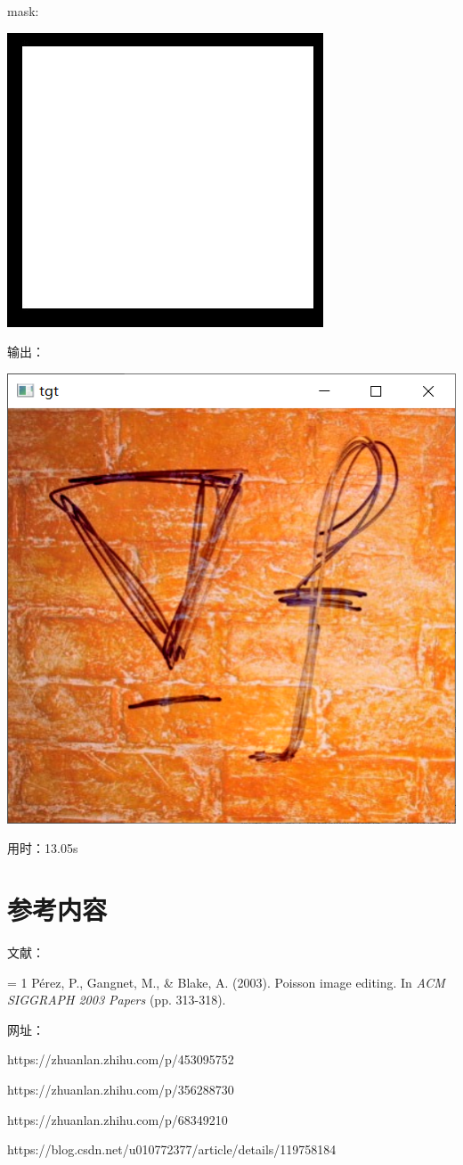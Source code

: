 \documentclass[12pt, a4paper, oneside]{report}
\begin{document}
	\noindent mask: 
	
	\centerline{
		\includegraphics[scale=0.35]{mask.jpg}
	}
	
	\noindent 输出：
	
	\centerline{	
		\includegraphics[scale=0.25]{Output2.png}
	}
	
	\noindent 用时：13.05s
	\section{参考内容}
	
	\noindent 文献：
	
	\hangafter = 1
	\hangindent 0.5in
	\noindent 
	Pérez, P., Gangnet, M., \& Blake, A. (2003). Poisson image editing. In \textsl{ACM SIGGRAPH 2003 Papers} (pp. 313-318).
	
	\noindent 网址：
	
	\noindent https://zhuanlan.zhihu.com/p/453095752
	
	\noindent https://zhuanlan.zhihu.com/p/356288730
	
	\noindent https://zhuanlan.zhihu.com/p/68349210
	
	\noindent https://blog.csdn.net/u010772377/article/details/119758184
	
\end{document}
